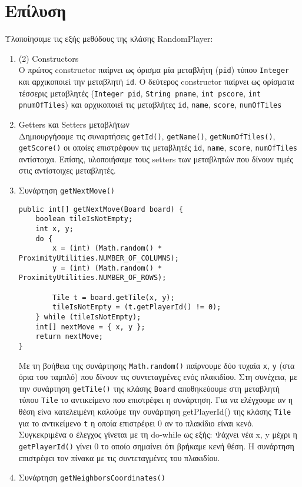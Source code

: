 \chapter{Επίλυση}
Υλοποίησαμε τις εξής μεθόδους της κλάσης RandomPlayer:
\begin{enumerate}
\item (2) Constructors\\
O πρώτος constructor παίρνει ως όρισμα μία μεταβλήτη (\lstinline!pid!) τύπου \lstinline!Integer!
και αρχικοποιεί την μεταβλητή \lstinline!id!.
Ο δεύτερος constructor παίρνει ως
ορίσματα τέσσερις μεταβλητές
(\lstinline!Integer pid!,
\lstinline!String pname!,
\lstinline!int pscore!,
\lstinline!int pnumOfTiles!)
και αρχικοποιεί τις μεταβλήτες \lstinline!id!, \lstinline!name!, \lstinline!score!, \lstinline!numOfTiles!
\item Getters και Setters μεταβλήτων\\
Δημιουργήσαμε τις συναρτήσεις \lstinline!getId()!, \lstinline!getName()!, \lstinline!getNumOfTiles()!,
\lstinline!getScore()! οι οποίες επιστρέφουν τις μεταβλητές \lstinline!id!, \lstinline!name!, \lstinline!score!,
\lstinline!numOfTiles! αντίστοιχα.
Επίσης, υλοποιήσαμε τους setters των μεταβλητών που δίνουν τιμές στις αντίστοιχες μεταβλητές.
\item Συνάρτηση \lstinline!getNextMove()!

\begin{lstlisting}[caption={Η συνάρτηση \lstinline!getNextMove()!}, breaklines=true, numbers=none]
public int[] getNextMove(Board board) {
	boolean tileIsNotEmpty;
	int x, y;
	do {
		x = (int) (Math.random() * ProximityUtilities.NUMBER_OF_COLUMNS);
		y = (int) (Math.random() * ProximityUtilities.NUMBER_OF_ROWS);

		Tile t = board.getTile(x, y);
		tileIsNotEmpty = (t.getPlayerId() != 0);
	} while (tileIsNotEmpty);
	int[] nextMove = { x, y };
	return nextMove;
}
\end{lstlisting}

Με τη βοήθεια της συνάρτησης \lstinline!Math.random()! παίρνουμε δύο τυχαία \lstinline!x!, \lstinline!y!
(στα όρια του ταμπλό) που δίνουν τις συντεταγμένες ενός πλακιδίου.
Στη συνέχεια, με την συνάρτηση \lstinline!getTile()!
της κλάσης \lstinline!Board!
αποθηκεύουμε στη μεταβλητή τύπου \lstinline!Tile!
το αντικείμενο που επιστρέφει η συνάρτηση.
Για να ελέγχουμε αν η θέση είνα κατελειμένη καλούμε την συνάρτηση getPlayerId() της
κλάσης \lstinline!Tile! για το αντικείμενο \lstinline!t! η οποία επιστρέφει $0$ αν το πλακίδιο είναι
κενό.
Συγκεκριμένα ο έλεγχος γίνεται με τη do-while ως εξής:
Ψάχνει νέα x, y μέχρι η \lstinline!getPlayerId()! γίνει $0$ το οποίο σημαίνει ότι βρήκαμε
κενή θέση.
Η συνάρτηση επιστρέφει τον πίνακα με τις συντεταγμένες του πλακιδίου.
\item Συνάρτηση \lstinline!getNeighborsCoordinates()! \cite{HexGrids}


\end{enumerate}
